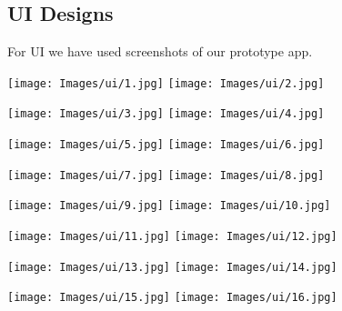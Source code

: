 \subsection{UI Designs}
\hspace{1cm}For UI we have used screenshots of our prototype app.

\hspace{2cm}
\texttt{[image: Images/ui/1.jpg]}
\hspace{3cm}
\texttt{[image: Images/ui/2.jpg]}
\hfill

\vspace{3cm}

\hspace{2cm}
\texttt{[image: Images/ui/3.jpg]}
\hspace{3cm}
\texttt{[image: Images/ui/4.jpg]}
\hfill

\hspace{2cm}
\texttt{[image: Images/ui/5.jpg]}
\hspace{3cm}
\texttt{[image: Images/ui/6.jpg]}
\hfill

\vspace{3cm}

\hspace{2cm}
\texttt{[image: Images/ui/7.jpg]}
\hspace{3cm}
\texttt{[image: Images/ui/8.jpg]}
\hfill

\hspace{2cm}
\texttt{[image: Images/ui/9.jpg]}
\hspace{3cm}
\texttt{[image: Images/ui/10.jpg]}
\hfill

\vspace{3cm}

\hspace{2cm}
\texttt{[image: Images/ui/11.jpg]}
\hspace{3cm}
\texttt{[image: Images/ui/12.jpg]}
\hfill

\hspace{2cm}
\texttt{[image: Images/ui/13.jpg]}
\hspace{3cm}
\texttt{[image: Images/ui/14.jpg]}
\hfill

\vspace{3cm}

\hspace{2cm}
\texttt{[image: Images/ui/15.jpg]}
\hspace{3cm}
\texttt{[image: Images/ui/16.jpg]}
\hfill


